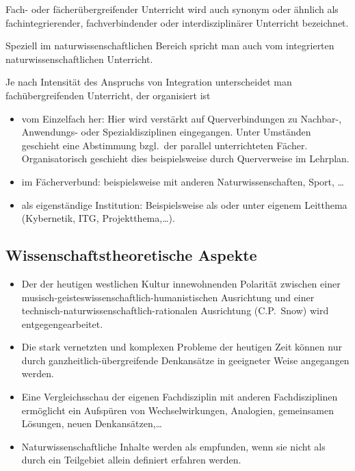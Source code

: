 Fach- oder f\"{a}cher\"{u}bergreifender Unterricht wird auch synonym
oder \"{a}hnlich als fachintegrierender, fachverbindender oder
interdisziplin\"{a}rer Unterricht bezeichnet.

\mip
Speziell im naturwissenschaftlichen Bereich spricht man auch vom
integrierten naturwissenschaftlichen Unterricht.

Je nach Intensit\"{a}t des Anspruchs von Integration unterscheidet man
fach\"{u}bergreifenden Unterricht, der organisiert ist
\begin{itemize}
\setlength{\itemsep}{0mm}
\item
vom Einzelfach her:
Hier wird verst\"{a}rkt auf Querverbindungen zu Nachbar-,
Anwendungs- oder Spezialdisziplinen eingegangen.
Unter Umst\"{a}nden geschieht eine Abstimmung
bzgl.\ der parallel unterrichteten F\"{a}cher.
Organisatorisch geschieht dies beispielsweise durch
Querverweise im Lehrplan.
\item
im F\"{a}cherverbund: beispielsweise mit anderen Naturwissenschaften, Sport, \dots
\item
als eigenst\"{a}ndige Institution:
Beispielsweise als  oder
unter eigenem Leitthema (Kybernetik, ITG, Projektthema,\dots).
\end{itemize}

\subsection{Wissenschaftstheoretische Aspekte}

\begin{itemize}
\setlength{\itemsep}{0mm}
\item
Der der heutigen westlichen Kultur innewohnenden Polarit\"{a}t
zwischen einer
musisch-geistes\-wis\-sen\-schaft\-lich-humanistischen
Ausrichtung und einer technisch-naturwissenschaftlich-rationalen
Ausrichtung (C.P.\ Snow) wird entgegengearbeitet.
\item
Die stark vernetzten und komplexen Probleme der heutigen Zeit
k\"{o}nnen nur durch ganz\-heit\-lich-\"{u}ber\-grei\-fen\-de
Denkans\"{a}tze in geeigneter Weise angegangen werden.
\item
Eine Vergleichsschau der eigenen Fachdisziplin
mit anderen Fachdisziplinen erm\"{o}glicht ein Aufsp\"{u}ren von
Wechselwirkungen, Analogien, gemeinsamen L\"{o}sungen, neuen
Denkans\"{a}tzen,\dots
\item
Naturwissenschaftliche Inhalte werden als  empfunden, wenn sie nicht als durch
ein Teilgebiet allein definiert erfahren werden.
\end{itemize}

